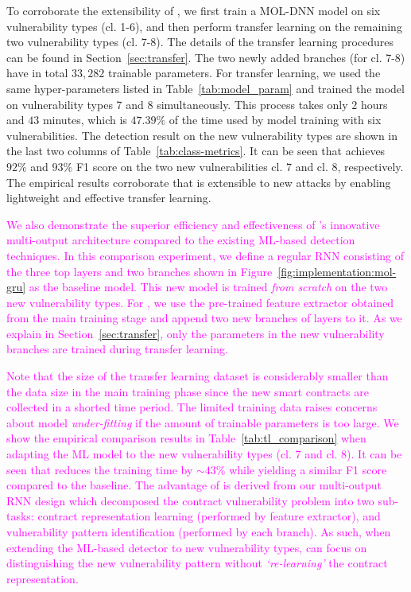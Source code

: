 To corroborate the extensibility of \sys{}, we first train a MOL-DNN model on six vulnerability types (cl. 1-6), and then perform transfer learning on the remaining two vulnerability types (cl. 7-8). The details of the transfer learning procedures can be found in Section~\ref{sec:transfer}. 
The two newly added branches (for cl. 7-8) have in total $33,282$ trainable parameters. For transfer learning, we used the same hyper-parameters listed in Table~\ref{tab:model_param} and trained the model on vulnerability types 7 and 8 simultaneously.
This process takes only $2$ hours and $43$ minutes, which is $47.39\%$ of the time used by model training with six vulnerabilities. 
The detection result on the new vulnerability types are shown in the last two columns of Table~\ref{tab:class-metrics}.
It can be seen that \sys{} achieves $92\%$ and $93\%$ F1 score on the two new vulnerabilities cl. 7 and cl. 8, respectively. 
The empirical results corroborate that \sys{} is extensible to new attacks by enabling lightweight and effective transfer learning.

\textcolor{magenta}{We also demonstrate the superior efficiency and effectiveness of \sys{}'s innovative multi-output architecture compared to the existing ML-based detection techniques. 
In this comparison experiment, we define a regular RNN consisting of the three top layers and two branches shown in Figure~\ref{fig:implementation:mol-gru} as the baseline model. This new model is trained \textit{from scratch} on the two new vulnerability types. For \sys{}, we use the pre-trained feature extractor obtained from the main training stage and append two new branches of layers to it. As we explain in Section~\ref{sec:transfer}, only the parameters in the new vulnerability branches are trained during transfer learning.}

\textcolor{magenta}{Note that the size of the transfer learning dataset is considerably smaller than the data size in the main training phase since the new smart contracts are collected in a shorted time period. The limited training data raises concerns about model \textit{under-fitting} if the amount of trainable parameters is too large. We show the empirical comparison results in Table~\ref{tab:tl_comparison} when adapting the ML model to the new vulnerability types (cl. 7 and cl. 8). It can be seen that \sys{} reduces the training time by $\sim 43\%$ while yielding a similar F1 score compared to the baseline. The advantage of \sys{} is derived from our multi-output RNN design which decomposed the contract vulnerability problem into two sub-tasks: contract representation learning (performed by feature extractor), and vulnerability pattern identification (performed by each branch). As such, when extending the ML-based detector to new vulnerability types, \sys{} can focus on distinguishing the new vulnerability pattern without \textit{`re-learning'} the contract representation.}

